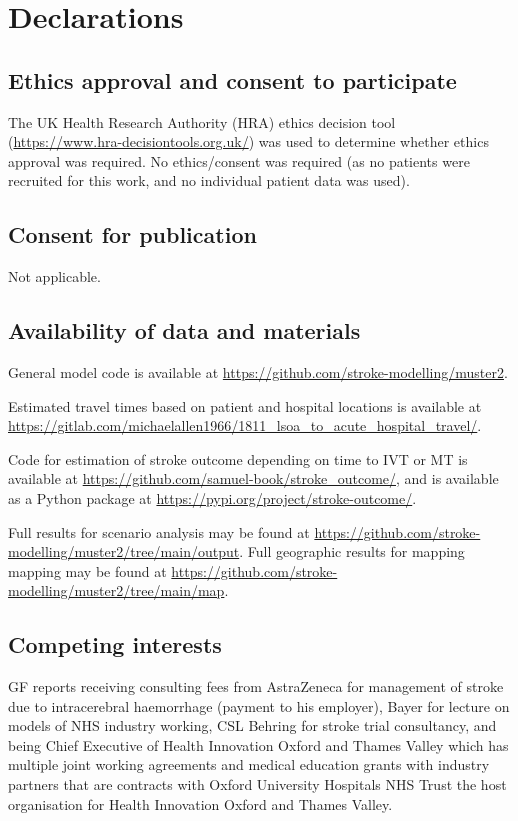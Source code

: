 \section{Declarations}

\subsection{Ethics approval and consent to participate}

The UK Health Research Authority (HRA) ethics decision tool (\url{https://www.hra-decisiontools.org.uk/}) was used to determine whether ethics approval was required. No ethics/consent was required (as no patients were recruited for this work, and no individual patient data was used).

\subsection{Consent for publication}

Not applicable.

\subsection{Availability of data and materials}

General model code is available at \url{https://github.com/stroke-modelling/muster2}.

Estimated travel times based on patient and hospital locations is available at \url{https://gitlab.com/michaelallen1966/1811_lsoa_to_acute_hospital_travel/}.

Code for estimation of stroke outcome depending on time to IVT or MT is available at \url{https://github.com/samuel-book/stroke_outcome/}, and is available as a Python package at \url{https://pypi.org/project/stroke-outcome/}.

Full results for scenario analysis may be found at \url{https://github.com/stroke-modelling/muster2/tree/main/output}. Full geographic results for mapping mapping may be found at \url{https://github.com/stroke-modelling/muster2/tree/main/map}.

\subsection*{Competing interests}

GF reports receiving consulting fees from AstraZeneca for management of stroke due to intracerebral haemorrhage (payment to his employer), Bayer for lecture on models of NHS industry working, CSL Behring for stroke trial consultancy, and being Chief Executive of Health Innovation Oxford and Thames Valley which has multiple joint working agreements and medical education grants with industry partners that are contracts with Oxford University Hospitals NHS Trust the host organisation for Health Innovation Oxford and Thames Valley.

